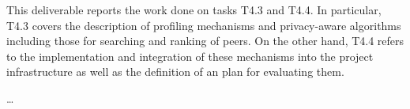 This deliverable reports the work done on tasks T4.3 and T4.4. In particular, T4.3 covers the description of profiling mechanisms and privacy-aware algorithms including those for searching and ranking of peers. On the other hand, T4.4 refers to the implementation and integration of these mechanisms into the project infrastructure as well as the definition of an plan for evaluating them.

\ldots